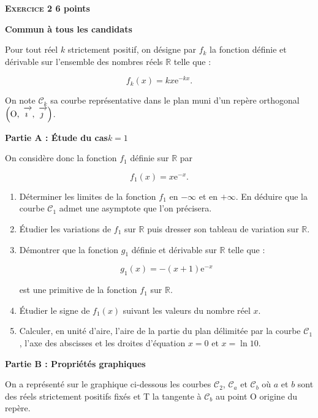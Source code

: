 \documentclass[10pt]{article}
\newcommand{\R}{\mathbb{R}}
\newcommand{\vect}[1]{\mathchoice%
{\overrightarrow{\displaystyle\mathstrut#1\,\,}}%
{\overrightarrow{\textstyle\mathstrut#1\,\,}}%
{\overrightarrow{\scriptstyle\mathstrut#1\,\,}}%
{\overrightarrow{\scriptscriptstyle\mathstrut#1\,\,}}}
\def\Oij{$\left(\text{O},~\vect{\imath},~\vect{\jmath}\right)$}
\begin{document}
\vspace{0,5cm}

\textbf{\textsc{Exercice 2} \hfill 6 points}
 
\textbf{Commun à tous les candidats}

\medskip
 
Pour tout réel $k$ strictement positif, on désigne par $f_{k}$ la fonction définie et dérivable sur l'ensemble des nombres réels $\R$ telle que : 

\[f_{k}(x) = kx\text{e}^{-kx}.\]
 
On note $\mathcal{C}_{k}$ sa courbe représentative dans le plan muni d'un repère orthogonal \Oij.

\medskip
 
\textbf{Partie A : Étude du cas}\boldmath $k = 1$\unboldmath 

\medskip

On considère donc la fonction $f_{1}$ définie sur $\R$ par 

\[f_{1}(x) = x\text{e}^{- x}.\] 

\begin{enumerate}
\item Déterminer les limites de la fonction $f_{1}$ en $- \infty$ et en $+ \infty$. En déduire que la courbe $\mathcal{C}_{1}$ admet une asymptote que l'on précisera. 
\item Étudier les variations de $f_{1}$ sur $\R$ puis dresser son tableau de variation sur $\R$. 
\item Démontrer que la fonction $g_{1}$ définie et dérivable sur $\R$ telle que : 

\[g_{1}(x) = - (x + 1)\text{e}^{- x}\]
 
est une primitive de la fonction $f_{1}$ sur $\R$. 
\item Étudier le signe de $f_{1}(x)$ suivant les valeurs du nombre réel $x$. 
\item Calculer, en unité d'aire, l'aire de la partie du plan délimitée par la courbe $\mathcal{C}_{1}$, l'axe des abscisses et les droites d'équation $x = 0$ et $x = \ln 10$. 
\end{enumerate} 

\bigskip

\textbf{Partie B : Propriétés graphiques} 

\medskip

On a représenté sur le graphique ci-dessous les courbes $\mathcal{C}_{2}$, $\mathcal{C}_{a}$ et $\mathcal{C}_{b}$ où $a$ et $b$ sont des réels strictement positifs fixés et T la tangente à $\mathcal{C}_{b}$ au point O origine du repère.
 
\end{document}
